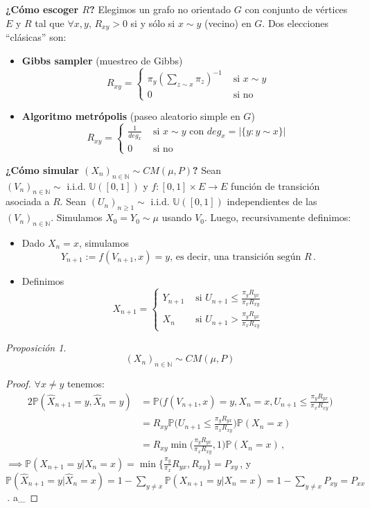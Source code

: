 \documentclass[letterpaper,11pt]{article} %
\theoremstyle{defbreak}
\theoremstyle{propbreak}
\theoremstyle{remark}
\theoremstyle{break}
\newtheorem{proposition}{Proposición}[subsection]
\def\P{\mathbb{P}}
\def\N{\mathbb{N}}
\def\unif{\mathbb{U}([0,1])}
\def\iid{\mbox{ i.i.d. }}
\def\gris{\color{mygray}}
\def\negro{\color{black}}
\def\findem{\null\hfill\color{white}a\color{black}_\square}
\def\xhat{\hat{X}}
\begin{document}
\newp \textbf{¿Cómo escoger $R$?}
\newline Elegimos un grafo no orientado $G$ con conjunto de vértices $E$ y  $R$ tal que $\forall x,y$, $R_{xy}>0$ si y sólo si $x \sim y$ (vecino) en $G$.
\newline Dos elecciones ``clásicas'' son:
\begin{itemize}
    \item \textbf{Gibbs sampler} (muestreo de Gibbs)
    $$ R_{xy}=\begin{cases}
    \pi_{y}(\displaystyle\sum_{z\sim x}\pi_z)^{-1}  & \mbox{ si }x\sim y\\
    0  & \mbox{ si no}
    \end{cases}$$
    \item \textbf{Algoritmo metrópolis} (paseo aleatorio simple en $G$)
    $$ R_{xy}=\begin{cases}
    \displaystyle\frac{1}{deg_x} & \mbox{ si }x\sim y\mbox{ con }deg_x=|\{y:y\sim x\}|\\
    0  & \mbox{ si no}
    \end{cases}$$
\end{itemize}
\label{m-h}
\textbf{¿Cómo simular $(X_n)_{n\in\N}\sim CM(\mu,P)$?}
\newline Sean $(V_n)_{n\in\N}\sim\iid \unif$ y $f:[0,1]\times E\to E$ función de transición asociada a $R$.
\newline Sean $(U_n)_{n\geq 1}\sim \iid\unif$ independientes de las $(V_n)_{n\in\N}$. Simulamos $X_0=Y_0\sim\mu$ usando $V_0$.
\newline Luego, recursivamente definimos:
\begin{itemize}
    \item Dado $X_n=x$, simulamos
    $$ Y_{n+1}:=f(V_{n+1},x)=y \mbox{, es decir, una transición según }R\,.$$
    \item Definimos
    $$ X_{n+1}=\begin{cases}
    Y_{n+1}  & \mbox{ si } U_{n+1}\leq \displaystyle\frac{\pi_y R_{yx}}{\pi_x R_{xy}}  \\
    X_n  & \mbox{ si } U_{n+1}> \displaystyle\frac{\pi_y R_{yx}}{\pi_x R_{xy}}
    \end{cases}$$
\end{itemize}
\begin{proposition}
$$ (X_n)_{n\in\N}\sim CM(\mu,P)$$
\end{proposition}
\begin{proof}
\gris
$\forall x\neq y$ tenemos:
\begin{alignat*}{2}
    \P(\xhat_{n+1}=y,\xhat_{n}=y) & = \P\bigg(f(V_{n+1},x)=y,X_n=x,U_{n+1}\leq \displaystyle\frac{\pi_y R_{yx}}{\pi_x R_{xy}}\bigg) \\
     & = R_{xy}\P\bigg(U_{n+1}\leq \frac{\pi_y R_{yx}}{\pi_x R_{xy}}\bigg)\P(X_n=x)\\
     & = R_{xy}\min\bigg(\frac{\pi_y R_{yx}}{\pi_x R_{xy}},1\bigg)\P(X_n=x) \,,
\end{alignat*}
$\implies \P(X_{n+1}=y| X_n=x)=\displaystyle\min\{\frac{\pi_y}{\pi_x}R_{yx},R_{xy}\}=P_{xy}$\,,
\newline y $\P(\xhat_{n+1}=y|\xhat_{n}=x)=1-\displaystyle\sum_{y\neq x}\P(X_{n+1}=y|X_n=x)=1-\sum_{y\neq x}P_{xy}=P_{xx}$\,. \findem
\negro
\end{proof}
\end{document}
